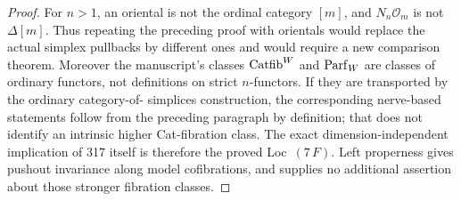 \begin{proof}
For $n>1$, an oriental is not the ordinal category $[m]$, and
$N_n\mathcal O_m$ is not $\Delta[m]$. Thus repeating the preceding
proof with orientals would replace the actual simplex pullbacks
by different ones and would require a new comparison theorem.
Moreover the manuscript's classes $\mathrm{Catfib}^W$ and $\mathrm{Parf}_W$
are classes of ordinary functors, not definitions on strict
$n$-functors. If they are transported by the ordinary category-of-
simplices construction, the corresponding nerve-based statements
follow from the preceding paragraph by definition; that does not
identify an intrinsic higher Cat-fibration class. The exact
dimension-independent implication of 317 itself is therefore the
proved Loc~$(7\,F)$. Left properness gives pushout invariance
along model cofibrations, and supplies no additional assertion
about those stronger fibration classes.
\end{proof}
